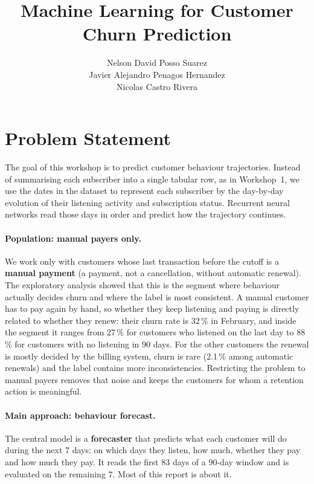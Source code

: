 \documentclass{article}
\title{Machine Learning for Customer Churn Prediction}
\author{Nelson David Posso Suarez \\ Javier Alejandro Penagos Hernandez \\ Nicolas Castro Rivera }
\date{}
\begin{document}
\maketitle

\section{Problem Statement}

The goal of this workshop is to predict customer behaviour trajectories. Instead of summarising each subscriber into a single tabular row, as in Workshop~1, we use the dates in the dataset to represent each subscriber by the day-by-day evolution of their listening activity and subscription status. Recurrent neural networks read those days in order and predict how the trajectory continues.

\paragraph{Population: manual payers only.} We work only with customers whose last transaction before the cutoff is a \textbf{manual payment} (a payment, not a cancellation, without automatic renewal). The exploratory analysis showed that this is the segment where behaviour actually decides churn and where the label is most consistent. A manual customer has to pay again by hand, so whether they keep listening and paying is directly related to whether they renew: their churn rate is 32\,\% in February, and inside the segment it ranges from 27\,\% for customers who listened on the last day to 88\,\% for customers with no listening in 90 days. For the other customers the renewal is mostly decided by the billing system, churn is rare (2.1\,\% among automatic renewals) and the label contains more inconsistencies. Restricting the problem to manual payers removes that noise and keeps the customers for whom a retention action is meaningful.

\paragraph{Main approach: behaviour forecast.} The central model is a \textbf{forecaster} that predicts what each customer will do during the next 7 days: on which days they listen, how much, whether they pay and how much they pay. It reads the first 83 days of a 90-day window and is evaluated on the remaining 7. Most of this report is about it.
\end{document}

